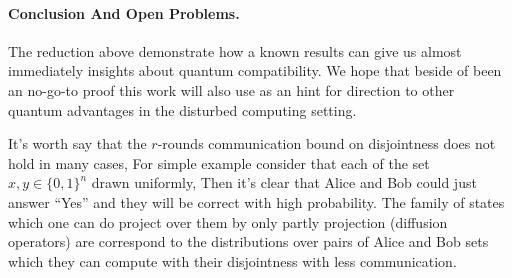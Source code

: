 \documentclass{article}
\begin{document}
\paragraph{Conclusion And Open Problems.} The reduction above demonstrate how a known results can give us almost immediately insights about quantum compatibility. We hope that beside of been an no-go-to proof this work will also use as an hint for direction to other quantum advantages in the disturbed computing setting. 

It's worth say that the $r$-rounds communication bound on disjointness does not hold in many cases, For simple example consider that each of the set $x,y \in \{0,1\}^{n}$ drawn uniformly, Then it's clear that Alice and Bob could just answer ``Yes'' and they will be correct with high probability. The family of states which one can do project over them by only partly projection (diffusion operators) are correspond to the distributions over pairs of Alice and Bob sets which they can compute with their disjointness with less communication.        
\printbibliography 
\end{document}
